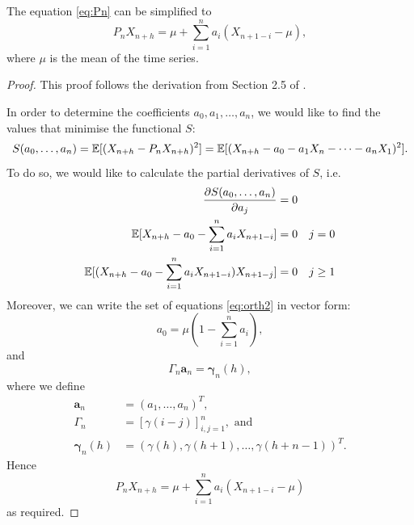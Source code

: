 \documentclass[a4paper, oneside]{discothesis}
\begin{document}
\begin{theorem}
    The equation \eqref{eq:Pn} can be simplified to
    \begin{equation} \label{eq:2.13}
        P_n X_{n+h} = \mu + \sum_{i=1}^n a_i (X_{n+1-i}-\mu),
    \end{equation}
    where $\mu$ is the mean of the time series.
\end{theorem}

\begin{proof}
This proof follows the derivation from Section 2.5 of \cite{itsf}.

In order to determine the coefficients $a_0, a_1, \dots, a_n$, we would like to find the values that minimise the functional $S$: %
\begin{equation*}
    S(a_0, \dots, a_n) = \operatorname{\mathbb{E}}[(X_{n+h} - P_n X_{n+h})^2]=\operatorname{\mathbb{E}}[(X_{n+h} - a_0 - a_1 X_n - \dots -a_n X_1)^2].
\end{equation*}
To do so, we would like to calculate the partial derivatives of $S$, i.e.
\begin{align}
    \frac{\partial S(a_0, \dots, a_n)}{\partial a_j} &= 0 \\
    \operatorname{\mathbb{E}}[X_{n+h} - a_0 - \sum_{i=1}^n a_i X_{n+1-i}] &= 0 \quad j = 0\label{eq:orth1}\\
    \operatorname{\mathbb{E}}[(X_{n+h} - a_0 - \sum_{i=1}^n a_i X_{n+1-i})X_{n+1-j}] &= 0 \quad j \geq 1 \label{eq:orth2}
\end{align}
Moreover, we can write the set of equations \eqref{eq:orth2} in vector form:
\begin{equation*}
    a_0 = \mu\left(1-\sum_{i=1}^n a_i\right),
\end{equation*}
and
\begin{equation*}
    \Gamma_n \boldsymbol{a}_n = \boldsymbol{\gamma}_n(h), \label{eq:2.9}
\end{equation*}
where we define
\begin{align*}
    \label{eq:2.10}\boldsymbol{a}_n &= (a_1, \dots, a_n)^T, \\
    \Gamma_n &= [\gamma(i-j)]^n_{i,j=1}, \text{ and}\\ 
    \boldsymbol{\gamma}_n(h) &= (\gamma(h), \gamma(h+1), \dots, \gamma(h+n-1))^T.
\end{align*}
Hence
\begin{equation*} %
    P_n X_{n+h} = \mu + \sum_{i=1}^n a_i (X_{n+1-i}-\mu)
\end{equation*}
as required.
\end{proof}
\end{document}
